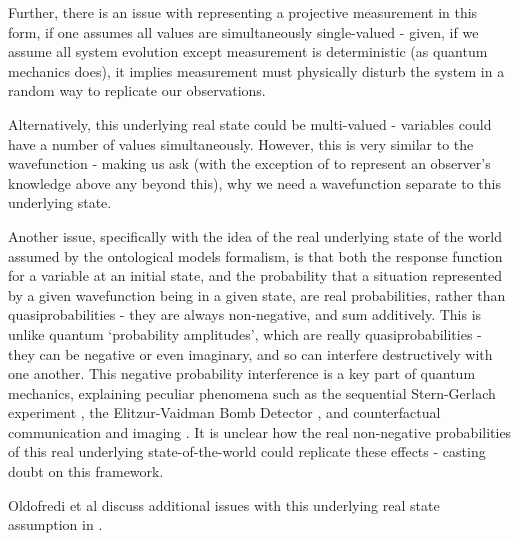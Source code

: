 \documentclass[superscriptaddress,reprint, floatfix, prl,nofootinbib]{revtex4-2}
\begin{document}
Further, there is an issue with representing a projective measurement in this form, if one assumes all values are simultaneously single-valued - given, if we assume all system evolution except measurement is deterministic (as quantum mechanics does), it implies measurement must physically disturb the system in a random way to replicate our observations.

Alternatively, this underlying real state could be multi-valued - variables could have a number of values simultaneously. However, this is very similar to the wavefunction - making us ask (with the exception of to represent an observer's knowledge above any beyond this), why we need a wavefunction separate to this underlying state.

Another issue, specifically with the idea of the real underlying state of the world assumed by the ontological models formalism, is that both the response function for a variable at an initial state, and the probability that a situation represented by a given wavefunction being in a given state, are real probabilities, rather than quasiprobabilities - they are always non-negative, and sum additively. This is unlike quantum `probability amplitudes', which are really quasiprobabilities - they can be negative or even imaginary, and so can interfere destructively with one another. This negative probability interference is a key part of quantum mechanics, explaining peculiar phenomena such as the sequential Stern-Gerlach experiment \cite{Sakurai2017Modern}, the Elitzur-Vaidman Bomb Detector \cite{Elitzur1993BombDet}, and counterfactual communication \cite{Salih2013CFComms,Hance2019Quantum} and imaging \cite{Hance2020CFGI}. It is unclear how the real non-negative probabilities of this real underlying state-of-the-world could replicate these effects - casting doubt on this framework.

Oldofredi et al discuss additional issues with this underlying real state assumption in \cite{Oldofredi2020Classification}.
\end{document}
